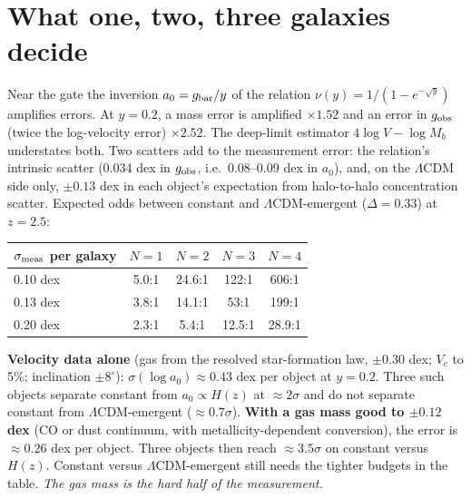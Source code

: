 \documentclass[11pt,letterpaper]{article}
\begin{document}
\section{What one, two, three galaxies decide}
Near the gate the inversion $a_0=g_{\rm bar}/y$ of the relation $\nu(y)=1/(1-e^{-\sqrt y})$ amplifies errors. At
$y=0.2$, a mass error is amplified $\times1.52$ and an error in $g_{\rm obs}$ (twice the log-velocity error)
$\times2.52$. The deep-limit estimator $4\log V-\log M_b$ understates both. Two scatters add to the measurement
error: the relation's intrinsic scatter (0.034 dex in $g_{\rm obs}$, i.e.\ 0.08--0.09 dex in $a_0$), and, on the
$\Lambda$CDM side only, $\pm0.13$ dex in each object's expectation from halo-to-halo concentration scatter.
Expected odds between constant and $\Lambda$CDM-emergent ($\Delta=0.33$) at $z=2.5$:
\begin{center}\begin{tabular}{lcccc}\toprule
$\sigma_{\rm meas}$ per galaxy & $N=1$ & $N=2$ & $N=3$ & $N=4$\\\midrule
0.10 dex & 5.0:1 & 24.6:1 & 122:1 & 606:1\\
0.13 dex & 3.8:1 & 14.1:1 & 53:1 & 199:1\\
0.20 dex & 2.3:1 & 5.4:1 & 12.5:1 & 28.9:1\\\bottomrule\end{tabular}\end{center}
\textbf{Velocity data alone} (gas from the resolved star-formation law, $\pm0.30$ dex; $V_c$ to 5\%; inclination
$\pm8^\circ$): $\sigma(\log a_0)\approx0.43$ dex per object at $y=0.2$. Three such objects separate constant from
$a_0\propto H(z)$ at $\approx2\sigma$ and do not separate constant from $\Lambda$CDM-emergent ($\approx0.7\sigma$).
\textbf{With a gas mass good to $\pm0.12$ dex} (CO or dust continuum, with metallicity-dependent conversion), the
error is $\approx0.26$ dex per object. Three objects then reach $\approx3.5\sigma$ on constant versus $H(z)$.
Constant versus $\Lambda$CDM-emergent still needs the tighter budgets in the table. \emph{The gas mass is the hard
half of the measurement.}
\end{document}
